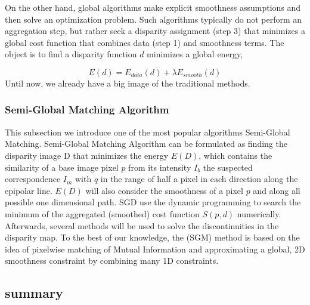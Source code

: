 On the other hand, global algorithms make explicit smoothness assumptions and then solve an optimization problem. Such algorithms typically do not perform an aggregation step, but rather seek a disparity assignment (step 3) that minimizes a global cost function that combines data (step 1) and smoothness terms. The object is to find a disparity function $d$ minimizes a global energy,

\begin{equation}
    E(d) = E_{data}(d) + \lambda E_{smooth}(d)
\end{equation}
Until now, we already have a big image of the traditional methods. 
\subsubsection{Semi-Global Matching Algorithm}
\label{Semi-Global Matching}
This subsection we introduce one of the most popular algorithms Semi-Global Matching. Semi-Global Matching Algorithm can be formulated as finding the disparity image D that minimizes the energy $E(D)$, which contains the similarity of a base image pixel $p$ from its intensity $I_b$ the suspected correspondence $I_m$ with $q$ in the range of half a pixel in each direction along the epipolar line. $E(D)$ will also consider the smoothness of a pixel $p$ and along all possible one dimensional path. SGD use the dynamic programming to search the minimum of the aggregated (smoothed) cost function $S(p, d)$ numerically. Afterwards, several methods will be used to solve the discontinuities in the disparity map. To the best of our knowledge, the  (SGM) method is based on the idea of pixelwise matching of Mutual Information and approximating a global, 2D smoothness constraint by combining many 1D constraints\cite{hirschmuller2007stereo}. 


\subsection{summary}


